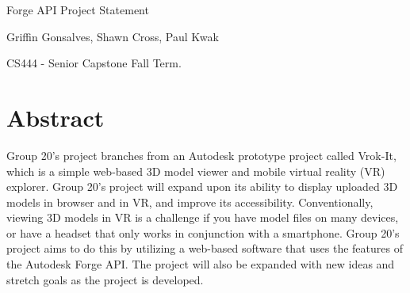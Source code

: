\documentclass[letterpaper,10pt,draftclsnofoot,onecolumn, titlepage]{IEEEtran}
\begin{document}
\begin{titlepage}
\centering
{\huge Forge API Project Statement\par}
\vfill
{\LARGE Griffin Gonsalves, Shawn Cross, Paul Kwak\par}
{\vspace{2mm}}
{\large CS444 - Senior Capstone Fall Term. \par}
{\vspace{10mm}}
\end{titlepage}

\section{Abstract}
{Group 20’s project branches from an Autodesk prototype project called Vrok-It, which is a simple web-based 3D model viewer and mobile virtual reality (VR) explorer. Group 20’s project will expand upon its ability to display uploaded 3D models in browser and in VR, and improve its accessibility. Conventionally, viewing 3D models in VR is a challenge if you have model files on many devices, or have a headset that only works in conjunction with a smartphone. Group 20’s project aims to do this by utilizing a web-based software that uses the features of the Autodesk Forge API. The project will also be expanded with new ideas and stretch goals as the project is developed.\par}
\end{document}
